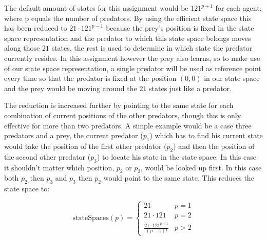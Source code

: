 The default amount of states for this assignment would be $121^{p+1}$ for each agent, where p equals the number of predators. By using the efficient state space this has been reduced to $21\cdot 121^{p-1}$ because the prey's position is fixed in the state space representation and the predator to which this state space belongs moves along those $21$ states, the rest is used to determine in which state the predator currently resides. In this assignment however the prey also learns, so to make use of our state space representation, a single predator will be used as reference point every time so that the predator is fixed at the position $(0, 0)$ in our state space and the prey would be moving around the $21$ states just like a predator. 

The reduction is increased further by pointing to the same state for each combination of current positions of the other predators, though this is only effective for more than two predators. A simple example would be a case three predators and a prey, the current predator ($p_1$) which has to find his current state would take the position of the first other predator ($p_2$) and then the position of the second other predator ($p_3$) to locate his state in the state space. In this case it shouldn't matter which position, $p_2$ or $p_3$, would be looked up first. In this case both $p_2$ then $p_3$ and $p_3$ then $p_2$ would point to the same state. This reduces the state space to:

\[
\mathrm{stateSpaces}(p) = 
\begin{cases}
	21 & p = 1\\
    21 \cdot 121 & p = 2 \\
    \frac{21\cdot 121^{p-1}}{(p-1)!}& p > 2
\end{cases}
\]


